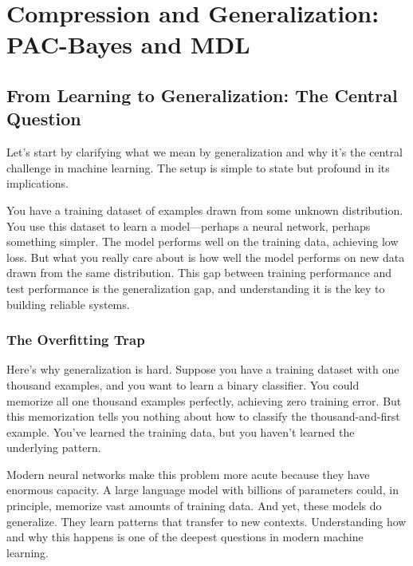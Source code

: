 \chapter{Compression and Generalization: PAC-Bayes and MDL}

\section{From Learning to Generalization: The Central Question}

Let's start by clarifying what we mean by generalization and why it's the central challenge in machine learning. The setup is simple to state but profound in its implications.

\vspace{0.3cm}

You have a training dataset of examples drawn from some unknown distribution. You use this dataset to learn a model---perhaps a neural network, perhaps something simpler. The model performs well on the training data, achieving low loss. But what you really care about is how well the model performs on new data drawn from the same distribution. This gap between training performance and test performance is the generalization gap, and understanding it is the key to building reliable systems.

\vspace{1em}

\subsection{The Overfitting Trap}

Here's why generalization is hard. Suppose you have a training dataset with one thousand examples, and you want to learn a binary classifier. You could memorize all one thousand examples perfectly, achieving zero training error. But this memorization tells you nothing about how to classify the thousand-and-first example. You've learned the training data, but you haven't learned the underlying pattern.

\vspace{0.3cm}

Modern neural networks make this problem more acute because they have enormous capacity. A large language model with billions of parameters could, in principle, memorize vast amounts of training data. And yet, these models do generalize. They learn patterns that transfer to new contexts. Understanding how and why this happens is one of the deepest questions in modern machine learning.

